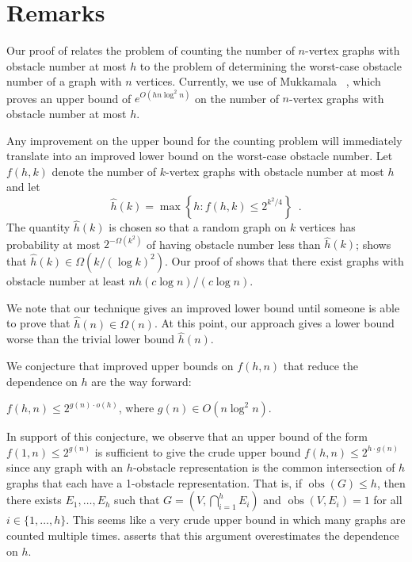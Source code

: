 \documentclass{patmorin}
\DeclareMathOperator{\obs}{obs}
\begin{document}
\section{Remarks}

Our proof of  relates the problem of counting the number
of $n$-vertex graphs with obstacle number at most $h$ to the problem of
determining the worst-case obstacle number of a graph with $n$ vertices.
Currently, we use  of Mukkamala \etal\ \cite{mukkamala.pach.ea:graphs},
which proves an
upper bound of $e^{O(hn\log^2 n)}$ on the number of $n$-vertex graphs
with obstacle number at most $h$.

Any improvement on the upper bound for the counting problem will
immediately translate into an improved lower bound on the worst-case
obstacle number.  Let $f(h,k)$ denote the number of $k$-vertex graphs
with obstacle number at most $h$ and let 
\[  
   \hat h(k) = \max\left\{h:f(h,k) \le 2^{k^2/4}\right\} \enspace . 
\]
The quantity $\hat h(k)$ is chosen so that a random graph
on $k$ vertices has probability at most $2^{-\Omega(k^2)}$ of having obstacle
number less than $\hat h(k)$;  shows that $\hat{h}(k)\in\Omega(k/(\log k)^2)$.
Our proof of  shows that
there exist graphs with obstacle number at least $n\hat{h}(c\log n)/(c\log
n)$. 

We note that our technique gives an improved lower bound until someone is
able to prove that $\hat h(n)\in\Omega(n)$.  At this point, our approach
gives a lower bound worse than the trivial lower bound $\hat{h}(n)$.

We conjecture that improved upper bounds on $f(h,n)$ that reduce the
dependence on $h$ are the way forward:
\begin{conj}
  $f(h,n) \le 2^{g(n)\cdot o(h)}$, where $g(n)\in O(n\log^2 n)$.
\end{conj}
In support of this conjecture, we observe that an upper bound of the
form $f(1,n)\le 2^{g(n)}$ is sufficient to give the crude upper bound
$f(h,n)\le 2^{h\cdot g(n)}$ since any graph with an $h$-obstacle
representation is the common intersection of $h$ graphs that each
have a 1-obstacle representation.  That is, if $\obs(G)\le h$, then
there exists $E_1,\ldots,E_h$ such that $G=(V,\bigcap_{i=1}^h E_i)$
and $\obs(V,E_i)=1$ for all $i\in \{1,\ldots,h\}$.  This seems like a
very crude upper bound in which many graphs are counted multiple times.
 asserts that this argument overestimates the dependence on $h$.
\end{document}
